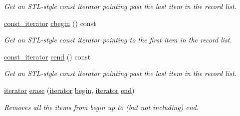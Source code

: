 \begin{DoxyCompactItemize}
\begin{DoxyCompactList}\small\item\em Get an S\+T\+L-\/style const iterator pointing past the last item in the record list. \end{DoxyCompactList}\item 
\hyperlink{class_mdt_1_1_plain_text_1_1_record_list_template_abfba36291fe9cb605ec432ed873ce4ea}{const\+\_\+iterator} \hyperlink{class_mdt_1_1_plain_text_1_1_record_list_template_a95499c9fa8b7bfe2f024d2d71931827e}{cbegin} () const \hypertarget{class_mdt_1_1_plain_text_1_1_record_list_template_a95499c9fa8b7bfe2f024d2d71931827e}{}\label{class_mdt_1_1_plain_text_1_1_record_list_template_a95499c9fa8b7bfe2f024d2d71931827e}

\begin{DoxyCompactList}\small\item\em Get an S\+T\+L-\/style const iterator pointing to the first item in the record list. \end{DoxyCompactList}\item 
\hyperlink{class_mdt_1_1_plain_text_1_1_record_list_template_abfba36291fe9cb605ec432ed873ce4ea}{const\+\_\+iterator} \hyperlink{class_mdt_1_1_plain_text_1_1_record_list_template_adbc8ef6c14603d50d96774fd81837a6c}{cend} () const \hypertarget{class_mdt_1_1_plain_text_1_1_record_list_template_adbc8ef6c14603d50d96774fd81837a6c}{}\label{class_mdt_1_1_plain_text_1_1_record_list_template_adbc8ef6c14603d50d96774fd81837a6c}

\begin{DoxyCompactList}\small\item\em Get an S\+T\+L-\/style const iterator pointing past the last item in the record list. \end{DoxyCompactList}\item 
\hyperlink{class_mdt_1_1_plain_text_1_1_record_list_template_a5b0caae56b05a38e53539cad1da8cd12}{iterator} \hyperlink{class_mdt_1_1_plain_text_1_1_record_list_template_a0266fea4751369b369d81933043b87a9}{erase} (\hyperlink{class_mdt_1_1_plain_text_1_1_record_list_template_a5b0caae56b05a38e53539cad1da8cd12}{iterator} \hyperlink{class_mdt_1_1_plain_text_1_1_record_list_template_af4f42b3785c7ddbbafd9bf3c15ead7d4}{begin}, \hyperlink{class_mdt_1_1_plain_text_1_1_record_list_template_a5b0caae56b05a38e53539cad1da8cd12}{iterator} \hyperlink{class_mdt_1_1_plain_text_1_1_record_list_template_accf34cd248a894d4af04510312bbdf23}{end})
\begin{DoxyCompactList}\small\item\em Removes all the items from begin up to (but not including) end. \end{DoxyCompactList}\end{DoxyCompactItemize}


